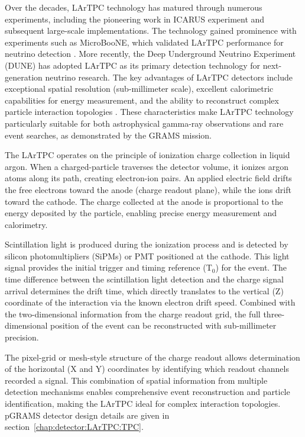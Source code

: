 \documentclass[a4paper,fleqn,longmktitle]{cas-dc}
\begin{document}
Over the decades, LArTPC technology has matured through numerous experiments, including the pioneering work in ICARUS experiment and subsequent large-scale implementations. The technology gained prominence with experiments such as MicroBooNE, which validated LArTPC performance for neutrino detection \cite{Acciarri_2017}. More recently, the Deep Underground Neutrino Experiment (DUNE) has adopted LArTPC as its primary detection technology for next-generation neutrino research. The key advantages of LArTPC detectors include exceptional spatial resolution (sub-millimeter scale), excellent calorimetric capabilities for energy measurement, and the ability to reconstruct complex particle interaction topologies \cite{FALCONE2022167217}. These characteristics make LArTPC technology particularly suitable for both astrophysical gamma-ray observations and rare event searches, as demonstrated by the GRAMS mission.

The LArTPC operates on the principle of ionization charge collection in liquid argon. When a charged-particle traverses the detector volume, it ionizes argon atoms along its path, creating electron-ion pairs. An applied electric field drifts the free electrons toward the anode (charge readout plane), while the ions drift toward the cathode. The charge collected at the anode is proportional to the energy deposited by the particle, enabling precise energy measurement and calorimetry.

Scintillation light is produced during the ionization process and is detected by silicon photomultipliers (SiPMs) or PMT positioned at the cathode. This light signal provides the initial trigger and timing reference (T$_0$) for the event. The time difference between the scintillation light detection and the charge signal arrival determines the drift time, which directly translates to the vertical (Z) coordinate of the interaction via the known electron drift speed. Combined with the two-dimensional information from the charge readout grid, the full three-dimensional position of the event can be reconstructed with sub-millimeter precision.

The pixel-grid or mesh-style structure of the charge readout allows determination of the horizontal (X and Y) coordinates by identifying which readout channels recorded a signal. This combination of spatial information from multiple detection mechanisms enables comprehensive event reconstruction and particle identification, making the LArTPC ideal for complex interaction topologies. pGRAMS detector design details are given in section~\ref{chap:detector:LArTPC:TPC}.
\end{document}
